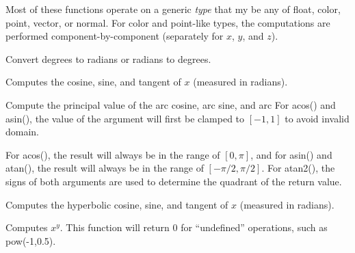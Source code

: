 \documentclass[11pt,letterpaper]{book}
\def\color{{\cf color}\xspace}
\def\float{{\cf float}\xspace}
\def\normal{{\cf normal}\xspace}
\def\point{{\cf point}\xspace}
\def\vector{{\cf vector}\xspace}
\begin{document}
Most of these functions operate on a generic \emph{type} that my be any
of \float, \color, \point, \vector, or \normal.  For \color and
\point-like types, the computations are performed component-by-component
(separately for $x$, $y$, and $z$).

\medskip

 
Convert degrees to radians or radians to degrees.
\apiend


  
Computes the cosine, sine, and tangent of $x$ (measured in radians).
\apiend

   
Compute the principal value of the arc cosine, arc sine, and arc
For {\cf acos()} and {\cf asin()}, the value of the argument
will first be clamped to $[-1,1]$ to avoid invalid domain.

For {\cf acos()}, the result will always be in the range of $[0, \pi]$,
and for {\cf asin()} and {\cf atan()}, the result will always be in the
range of $[-\pi/2, \pi/2]$.  For {\cf atan2()}, the signs of both
arguments are used to determine the quadrant of the return value.
\apiend

  
Computes the hyperbolic cosine, sine, and tangent of $x$ (measured in radians).
\apiend

Computes $x^y$.  This function will return 0 for ``undefined''
operations, such as {\cf pow(-1,0.5)}.
\apiend
\end{document}
